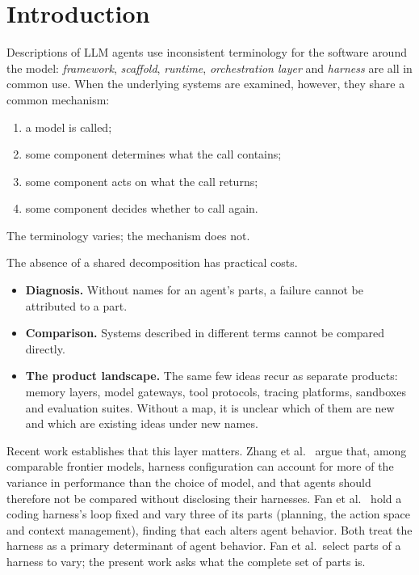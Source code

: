 \section{Introduction}

Descriptions of LLM agents use inconsistent terminology for the software around the model: \emph{framework}, \emph{scaffold}, \emph{runtime}, \emph{orchestration layer} and \emph{harness} are all in common use. When the underlying systems are examined, however, they share a common mechanism:

\begin{enumerate}
\def\labelenumi{\arabic{enumi}.}
\tightlist
\item
  a model is called;
\item
  some component determines what the call contains;
\item
  some component acts on what the call returns;
\item
  some component decides whether to call again.
\end{enumerate}

The terminology varies; the mechanism does not.

The absence of a shared decomposition has practical costs.

\begin{itemize}
\tightlist
\item
  \textbf{Diagnosis.} Without names for an agent's parts, a failure cannot be attributed to a part.
\item
  \textbf{Comparison.} Systems described in different terms cannot be compared directly.
\item
  \textbf{The product landscape.} The same few ideas recur as separate products: memory layers, model gateways, tool protocols, tracing platforms, sandboxes and evaluation suites. Without a map, it is unclear which of them are new and which are existing ideas under new names.
\end{itemize}

Recent work establishes that this layer matters. Zhang et al.~\cite{zhang2026stop} argue that, among comparable frontier models, harness configuration can account for more of the variance in performance than the choice of model, and that agents should therefore not be compared without disclosing their harnesses. Fan et al.~\cite{fan2026empirical} hold a coding harness's loop fixed and vary three of its parts (planning, the action space and context management), finding that each alters agent behavior. Both treat the harness as a primary determinant of agent behavior. Fan et al.~select parts of a harness to vary; the present work asks what the complete set of parts is.

